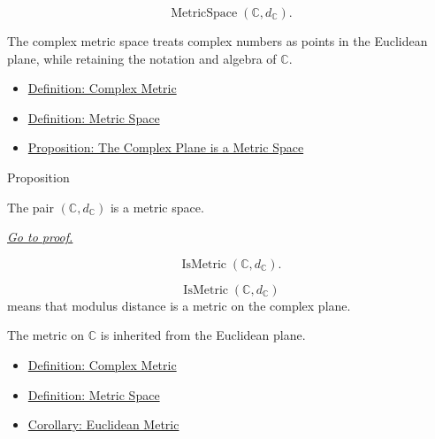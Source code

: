 \begin{remark*}
\[
\operatorname{MetricSpace}(\mathbb{C},d_{\mathbb{C}}).
\]
\end{remark*}

\begin{remark*}[Interpretation]
The complex metric space treats complex numbers as points in the Euclidean
plane, while retaining the notation and algebra of \(\mathbb{C}\).
\end{remark*}

\begin{dependencies}
\begin{itemize}
  \item \hyperref[def:complex-metric]{Definition: Complex Metric}
  \item \hyperref[def:metric-space]{Definition: Metric Space}
  \item \hyperref[prop:complex-plane-metric-space]{Proposition: The Complex Plane is a Metric Space}
\end{itemize}
\end{dependencies}

\begin{propositionbox}{Proposition}
\begin{proposition}
\label{prop:complex-plane-metric-space}
The pair \((\mathbb{C},d_{\mathbb{C}})\) is a metric space.

\smallskip
\noindent
\hyperref[prf:complex-plane-metric-space]{\textit{Go to proof.}}
\end{proposition}
\end{propositionbox}

\begin{remark*}
\[
  \operatorname{IsMetric}(\mathbb{C},d_{\mathbb{C}}).
\]
\end{remark*}

\begin{remark*}
\[
\operatorname{IsMetric}(\mathbb{C},d_{\mathbb{C}})
\]
means that modulus distance is a metric on the complex plane.
\end{remark*}

\begin{remark*}[Interpretation]
The metric on \(\mathbb{C}\) is inherited from the Euclidean plane.
\end{remark*}

\begin{dependencies}
\begin{itemize}
  \item \hyperref[def:complex-metric]{Definition: Complex Metric}
  \item \hyperref[def:metric-space]{Definition: Metric Space}
  \item \hyperref[cor:euclidean-metric]{Corollary: Euclidean Metric}
\end{itemize}
\end{dependencies}

